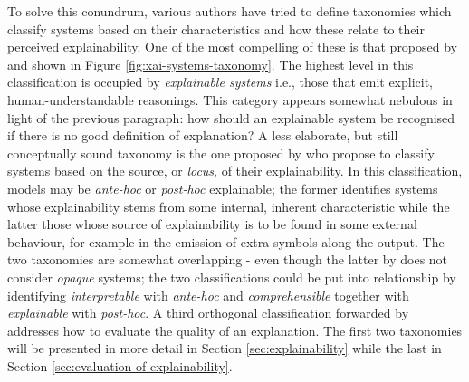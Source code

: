 To solve this conundrum, various authors have tried to define taxonomies which classify systems based on their characteristics and how these relate to their perceived explainability.
One of the most compelling of these is that proposed by \citet{Doran2018} and shown in Figure \ref{fig:xai-systems-taxonomy}.
The highest level in this classification is occupied by \textit{explainable systems} i.e., those that emit explicit, human-understandable reasonings.
This category appears somewhat nebulous in light of the previous paragraph: how should an explainable system be recognised if there is no good definition of explanation?
A less elaborate, but still conceptually sound taxonomy is the one proposed by \citet{mittelstadt2019explaining} who propose to classify systems based on the source, or \textit{locus}, of their explainability.
In this classification, models may be \textit{ante-hoc} or \textit{post-hoc} explainable; the former identifies systems whose explainability stems from some internal, inherent characteristic while the latter those whose source of explainability is to be found in some external behaviour, for example in the emission of extra symbols along the output.
The two taxonomies are somewhat overlapping - even though the latter by \citet{mittelstadt2019explaining} does not consider \textit{opaque} systems; the two classifications could be put into relationship by identifying \textit{interpretable} with \textit{ante-hoc} and \textit{comprehensible} together with \textit{explainable} with \textit{post-hoc}.
A third orthogonal classification forwarded by \citet{doshi2017towards} addresses how to evaluate the quality of an explanation.
The first two taxonomies will be presented in more detail in Section \ref{sec:explainability} while the last in Section \ref{sec:evaluation-of-explainability}.


